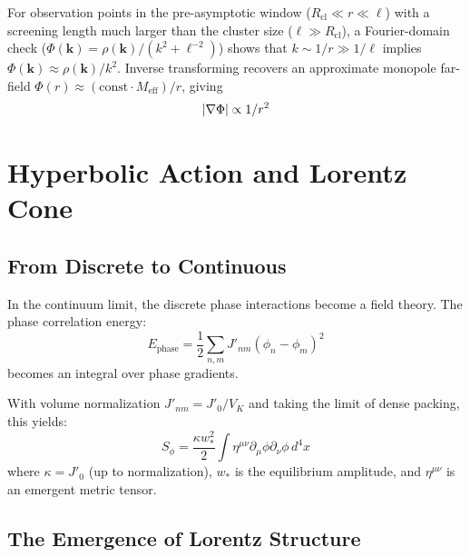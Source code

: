 \documentclass[11pt]{article}
\begin{document}
For observation points in the pre-asymptotic window ($R_{\text{cl}} \ll r \ll \ell$) with a screening length much larger than the cluster size ($\ell \gg R_{\text{cl}}$), a Fourier-domain check ($\Phi(\mathbf k)=\rho(\mathbf k)/(k^2+\ell^{-2})$) shows that $k\sim 1/r\gg 1/\ell$ implies $\Phi(\mathbf k)\approx \rho(\mathbf k)/k^2$. Inverse transforming recovers an approximate monopole far-field $\Phi(r)\approx (\text{const}\cdot M_{\mathrm{eff}})/r$, giving 
\begin{align}
\abs{\nabla\Phi}\propto 1/r^2
\end{align}


\section{Hyperbolic Action and Lorentz Cone}

\subsection{From Discrete to Continuous}

In the continuum limit, the discrete phase interactions become a field theory. The phase correlation energy:
\begin{equation}
E_{\text{phase}} = \frac{1}{2} \sum_{n,m} J'_{nm} (\phi_n - \phi_m)^2
\end{equation}
becomes an integral over phase gradients.

With volume normalization $J'_{nm} = J'_0/V_K$ and taking the limit of dense packing, this yields:
\begin{equation}
S_\phi = \frac{\kappa w_*^2}{2} \int \eta^{\mu\nu} \partial_\mu\phi \partial_\nu\phi \, d^4x
\end{equation}
where $\kappa = J'_0$ (up to normalization), $w_*$ is the equilibrium amplitude, and $\eta^{\mu\nu}$ is an emergent metric tensor.

\subsection{The Emergence of Lorentz Structure}
\end{document}
